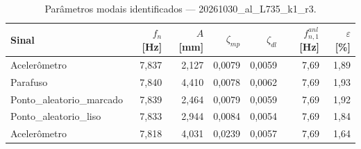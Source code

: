 \begin{table}[htbp]
  \centering
  \caption{Parâmetros modais identificados — 20261030\_al\_L735\_k1\_r3.}
  \label{tab:modal_20261030_al_L735_k1_r3}
  \begin{tabular}{lrrrrrr}
    \toprule
    Sinal & $f_n$ [Hz] & $A$ [mm] & $\zeta_{mp}$ & $\zeta_{dl}$ & $f_{n,1}^{anl}$ [Hz] & $\varepsilon$ [\%] \\
    \midrule
    Acelerômetro & 7{,}837 & 2{,}127 & 0{,}0079 & 0{,}0059 & 7{,}69 & 1{,}89 \\
    Parafuso & 7{,}840 & 4{,}410 & 0{,}0078 & 0{,}0062 & 7{,}69 & 1{,}93 \\
    Ponto\_aleatorio\_marcado & 7{,}839 & 2{,}464 & 0{,}0079 & 0{,}0059 & 7{,}69 & 1{,}92 \\
    Ponto\_aleatorio\_liso & 7{,}833 & 2{,}944 & 0{,}0084 & 0{,}0054 & 7{,}69 & 1{,}84 \\
    Acelerômetro & 7{,}818 & 4{,}031 & 0{,}0239 & 0{,}0057 & 7{,}69 & 1{,}64 \\
    \bottomrule
  \end{tabular}
\end{table}
